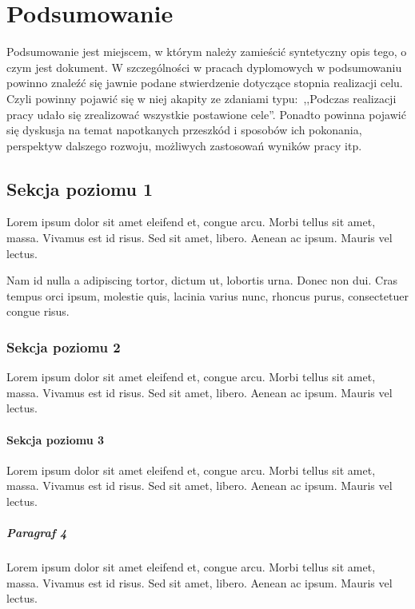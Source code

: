 \chapter{Podsumowanie}\label{chap:podsumowanie}

Podsumowanie jest miejscem, w którym należy zamieścić syntetyczny opis tego, o czym jest dokument. W szczególności w pracach dyplomowych w podsumowaniu powinno znaleźć się jawnie podane stwierdzenie dotyczące stopnia realizacji celu. Czyli powinny pojawić się w niej akapity ze zdaniami typu:~,,Podczas realizacji pracy udało się zrealizować wszystkie postawione cele''. Ponadto powinna pojawić się dyskusja na temat napotkanych przeszkód i sposobów ich pokonania, perspektyw dalszego rozwoju, możliwych zastosowań wyników pracy itp. 

\section{Sekcja poziomu 1}%
Lorem ipsum dolor sit amet eleifend et, congue arcu. Morbi tellus sit amet, massa. Vivamus est id risus. Sed sit amet, libero. Aenean ac ipsum. Mauris vel lectus. 

Nam id nulla a adipiscing tortor, dictum ut, lobortis urna. Donec non dui. Cras tempus orci ipsum, molestie quis, lacinia varius nunc, rhoncus purus, consectetuer congue risus. 

\subsection{Sekcja poziomu 2}
Lorem ipsum dolor sit amet eleifend et, congue arcu. Morbi tellus sit amet, massa. Vivamus est id risus. Sed sit amet, libero. Aenean ac ipsum. Mauris vel lectus. 
\subsubsection{Sekcja poziomu 3}
Lorem ipsum dolor sit amet eleifend et, congue arcu. Morbi tellus sit amet, massa. Vivamus est id risus. Sed sit amet, libero. Aenean ac ipsum. Mauris vel lectus. 
\paragraph{Paragraf 4}
Lorem ipsum dolor sit amet eleifend et, congue arcu. Morbi tellus sit amet, massa. Vivamus est id risus. Sed sit amet, libero. Aenean ac ipsum. Mauris vel lectus. 

